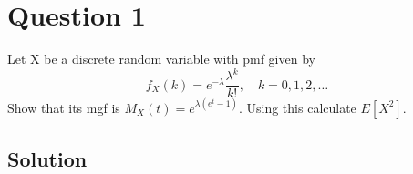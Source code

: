 \section*{Question 1}

Let X be a discrete random variable with pmf given by
\begin{equation*}
    f_X(k) = e^{-\lambda} \frac{\lambda^k}{k!}, \quad k = 0, 1, 2, \ldots
\end{equation*}
Show that its mgf is \(M_X(t) = e^{\lambda(e^t - 1)}\).
Using this calculate \(E[X^2]\).

\subsection*{Solution}
